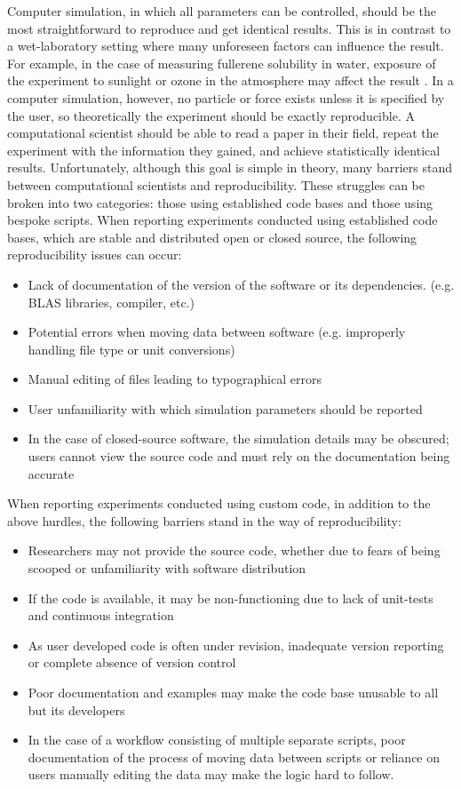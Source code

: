 Computer simulation, in which all parameters can be controlled, should be the most straightforward to reproduce and get identical results. 
This is in contrast to a wet-laboratory setting where many unforeseen factors can influence the result.
For example, in the case of measuring fullerene solubility in water, exposure of the experiment to sunlight or ozone in the atmosphere may affect the result \cite{Isaacson2009}.
In a computer simulation, however, no particle or force exists unless it is specified by the user, so theoretically the experiment should be exactly reproducible.
A computational scientist should be able to read a paper in their field, repeat the experiment with the information they gained, and achieve statistically identical results.
Unfortunately, although this goal is simple in theory, many barriers stand between computational scientists and reproducibility.
These struggles can be broken into two categories: those using established code bases and those using bespoke scripts.
When reporting experiments conducted using established code bases, which are stable and distributed open or closed source, the following reproducibility issues can occur:
\begin{itemize}
    \item Lack of documentation of the version of the software or its dependencies. (e.g. BLAS libraries, compiler, etc.)
    \item Potential errors when moving data between software (e.g. improperly handling file type or unit conversions)
    \item Manual editing of files leading to typographical errors
    \item User unfamiliarity with which simulation parameters should be reported
    \item In the case of closed-source software, the simulation details may be obscured; users cannot view the source code and must rely on the documentation being accurate
\end{itemize}
When reporting experiments conducted using custom code, in addition to the above hurdles, the following barriers stand in the way of reproducibility:
\begin{itemize}
    \item Researchers may not provide the source code, whether due to fears of being scooped or unfamiliarity with software distribution
    \item If the code is available, it may be non-functioning due to lack of unit-tests and continuous integration
    \item As user developed code is often under revision, inadequate version reporting or complete absence of version control
    \item Poor documentation and examples may make the code base unusable to all but its developers
    \item In the case of a workflow consisting of multiple separate scripts, poor documentation of the process of moving data between scripts or reliance on users manually editing the data may make the logic hard to follow.
\end{itemize}
